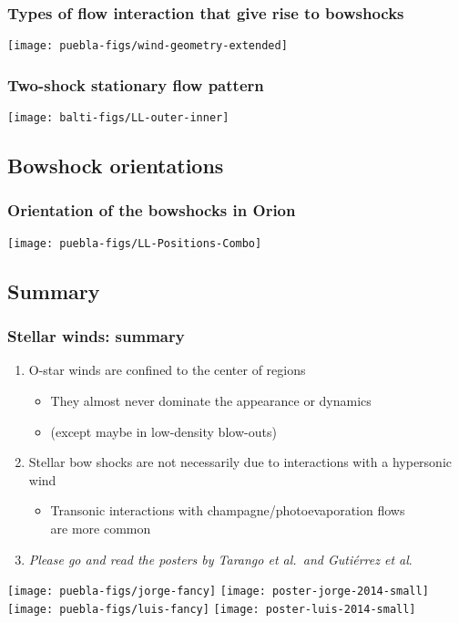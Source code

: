 \documentclass[presentation]{beamer}
\begin{document}
\begin{frame}
  \frametitle{Types of flow interaction that give rise to bowshocks}
  \centering\texttt{[image: puebla-figs/wind-geometry-extended]}
\end{frame}


\begin{frame}
  \frametitle{Two-shock stationary flow pattern}
  \centering\texttt{[image: balti-figs/LL-outer-inner]}
\end{frame}

\subsection{Bowshock orientations}



\begin{frame}
  \frametitle{Orientation of the bowshocks in Orion}
  \centering
  \texttt{[image: puebla-figs/LL-Positions-Combo]}
\end{frame}

\subsection{Summary}

\begin{frame}
  \frametitle{Stellar winds: summary}
  
  \begin{enumerate}
  \item O-star winds are confined to the center of \hii{}
    regions
    \begin{itemize}
    \item They almost never dominate the appearance or dynamics
    \item (except maybe in low-density blow-outs)
    \end{itemize}
  \item Stellar bow shocks are not necessarily due to interactions
    with a hypersonic wind
    \begin{itemize}
    \item Transonic interactions with champagne/photoevaporation flows\\
      are more common
    \end{itemize}
  \item \textit{Please go and read the posters by Tarango et al.\ and
      Guti\'errez et al}.
  \end{enumerate}
  \bigskip
  \texttt{[image: puebla-figs/jorge-fancy]}
  \texttt{[image: poster-jorge-2014-small]}
  \texttt{[image: puebla-figs/luis-fancy]}
  \texttt{[image: poster-luis-2014-small]}
\end{frame}
\end{document}
